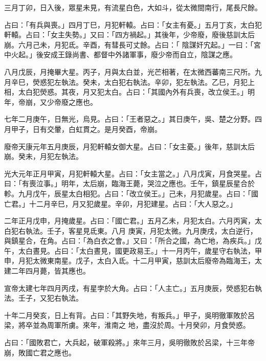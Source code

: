 \begin{pinyinscope}
 三月丁卯，日入後，眾星未見，有流星白色，大如斗，從太微間南行，尾長尺餘。



 占曰：「有兵與喪。」四月丁巳，月犯軒轅。占曰：「女主有憂。」五月丁亥，太白犯軒轅。占曰：「女主失勢。」又曰：「四方禍起。」其後年，少帝廢，廢後慈訓太后崩。六月己未，月犯氐。辛酉，有彗長可丈餘。占曰：「
 陰謀奸宄起。」一曰：「宮中火起。」後安成王錄尚書、都督中外諸軍事，廢少帝而自立，陰謀之應。



 八月戊辰，月掩畢大星。丙子，月與太白並，光芒相著，在太微西蕃南三尺所。九月辛巳，熒惑犯左執法。癸未，太白犯右執法。辛卯，犯左執法。乙巳，月犯上相，太白犯熒惑。其夜，月又犯太白。占曰：「其國內外有兵喪，改立侯王。」明年，帝崩，又少帝廢之應也。



 七年二月庚午，日無光，烏見。占曰：「王者惡之。」其日庚午，吳、楚之分野。四月甲子，日有交暈，白虹貫之。是月癸酉，帝崩。



 廢帝天康元年五月庚辰，月犯軒轅女御大星。占曰：「女主憂。」後年，慈訓太后崩。癸未，月犯左執法。



 光大元年正月甲寅，月犯軒轅大星。占曰：「女主當之。」八月戊寅，月食哭星。占曰：「有喪泣事。」明年，太后崩，臨海王薨，哭泣之應也。壬午，鎮星辰星合於軫。九月戊午，辰星太白相犯。占曰：「改立侯王。」己未，月犯歲星。占曰：「國亡君。」十二月辛巳，月又犯歲星。辛卯，月犯建星。占曰：「大人惡之。」



 二年正月戊申，月掩歲星。占曰：「國亡君。」五月乙未，月犯太白。六月丙寅，太白犯右執法。壬子，客星見氐東。八月
 庚寅，月犯太微。九月庚戌，太白逆行，與鎮星合，在角。占曰：「為白衣之會。」又曰：「所合之國，為亡地，為疾兵。」戊午，太白晝見。占曰：「太白晝見，國更政易王。」十一月丙午，歲星守右執法，甲申，月犯太微東南星。戊子，太白入氐。十二月甲寅，慈訓太后廢帝為臨海王，太建二年四月薨，皆其應也。



 宣帝太建七年四月丙戌，有星孛於大角。占曰：「人主亡。」五月庚辰，熒惑犯右執法。壬子，又犯右執法。



 十年二月癸亥，日上有背。占曰：「其野失地，有叛兵。」甲子，吳明徹軍敗於呂梁，將卒並為周軍所虜。來年，淮南之
 地，盡沒於周。十月癸卯，月食熒惑。



 占曰：「國敗君亡，大兵起，破軍殺將。」來年三月，吳明徹敗於呂梁，十三年帝崩，敗國亡君之應也。




\end{pinyinscope}
